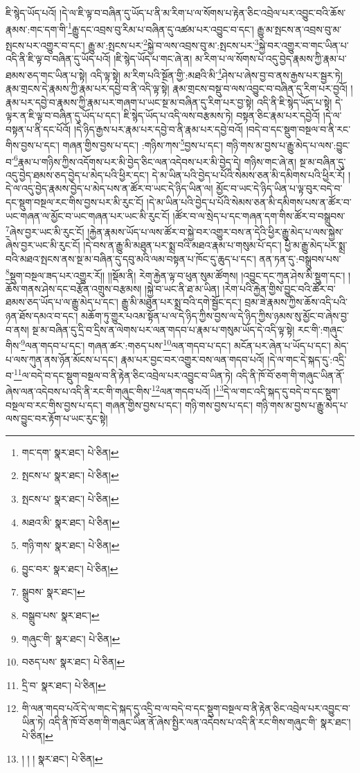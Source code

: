 ཇི་སྙེད་ཡོད་པའོ། །དེ་ལ་ཇི་ལྟ་བ་བཞིན་དུ་ཡོད་པ་ནི་མ་རིག་པ་ལ་སོགས་པ་རྟེན་ཅིང་འབྲེལ་པར་འབྱུང་བའི་ཆོས་རྣམས་:གང་དག་གི་\footnote{གང་དག་  སྣར་ཐང་།  པེ་ཅིན། }རྒྱུ་དང་འབྲས་བུ་རིམ་པ་བཞིན་དུ་འཚམ་པར་འབྱུང་བ་དང་། རྒྱུ་མ་སྤངས་ན་འབྲས་བུ་མ་སྤངས་པར་འགྱུར་བ་དང་། རྒྱུ་མ་:སྤངས་པར་\footnote{སྤངས་པ་  སྣར་ཐང་།  པེ་ཅིན། }སྐྱེ་བ་ལས་འབྲས་བུ་མ་:སྤངས་པར་\footnote{སྤངས་པ་  སྣར་ཐང་།  པེ་ཅིན། }སྐྱེ་བར་འགྱུར་བ་གང་ཡིན་པ་འདི་ནི་ཇི་ལྟ་བ་བཞིན་དུ་ཡོད་པའོ། །ཇི་སྙེད་ཡོད་པ་གང་ཞེ་ན། མ་རིག་པ་ལ་སོགས་པ་འདུ་བྱེད་རྣམས་ཀྱི་རྣམ་པ་ཐམས་ཅད་གང་ཡིན་པ་སྟེ། འདི་ལྟ་སྟེ། མ་རིག་པའི་སྔོན་གྱི་:མཐའི་མི་\footnote{མཐའ་མི་  སྣར་ཐང་།  པེ་ཅིན། }ཤེས་པ་ཞེས་བྱ་བ་ནས་རྒྱས་པར་སྦྱར་ཏེ། རྣམ་གྲངས་དེ་རྣམས་ཀྱི་རྣམ་པར་དབྱེ་བ་ནི་འདི་ལྟ་སྟེ། རྣམ་གྲངས་བསྡུ་བ་ལས་འབྱུང་བ་བཞིན་དུ་རིག་པར་བྱའོ། །རྣམ་པར་དབྱེ་བ་རྣམས་ཀྱི་རྣམ་པར་གཞག་པ་ཡང་སྔ་མ་བཞིན་དུ་རིག་པར་བྱ་སྟེ། འདི་ནི་ཇི་སྙེད་ཡོད་པ་སྟེ། དེ་ལྟར་ན་ཇི་ལྟ་བ་བཞིན་དུ་ཡོད་པ་དང་། ཇི་སྙེད་ཡོད་པ་འདི་ལས་བརྩམས་ཏེ། བསྟན་ཅིང་རྣམ་པར་དབྱེའོ། །དེ་ལ་བསྟན་པ་ནི་དང་པོའོ། །དེ་ཉིད་རྒྱས་པར་རྣམ་པར་དབྱེ་བ་ནི་རྣམ་པར་དབྱེ་བའོ། །བདེ་བ་དང་སྡུག་བསྔལ་བ་ནི་རང་གིས་བྱས་པ་དང་། གཞན་གྱིས་བྱས་པ་དང་། :གཉིས་ཀས་\footnote{གཉི་གས་  སྣར་ཐང་།  པེ་ཅིན། }བྱས་པ་དང་། གཉི་གས་མ་བྱས་པ་རྒྱུ་མེད་པ་ལས་:བྱུང་བ་\footnote{བྱུང་བར་  སྣར་ཐང་།  པེ་ཅིན། }རྣམ་པ་གཉིས་ཀྱིས་འདོགས་པར་མི་བྱེད་ཅིང་ལན་འདེབས་པར་མི་བྱེད་དེ། གཉིས་གང་ཞེ་ན། སྔ་མ་བཞིན་དུ་འདུ་བྱེད་ཐམས་ཅད་བྱེད་པ་མེད་པའི་ཕྱིར་དང་། དེ་མ་ཡིན་པའི་བྱེད་པ་པོའི་སེམས་ཅན་མི་དམིགས་པའི་ཕྱིར་རོ། །དེ་ལ་འདུ་བྱེད་རྣམས་བྱེད་པ་མེད་པས་ན་ཚོར་བ་ཡང་དེ་ཉིད་ཡིན་ལ། མྱོང་བ་ཡང་དེ་ཉིད་ཡིན་པ་ལྟ་བུར་བདེ་བ་དང་སྡུག་བསྔལ་རང་གིས་བྱས་པར་མི་རུང་ངོ། །དེ་མ་ཡིན་པའི་བྱེད་པ་པོའི་སེམས་ཅན་མི་དམིགས་པས་ན་ཚོར་བ་ཡང་གཞན་ལ་མྱོང་བ་ཡང་གཞན་པར་ཡང་མི་རུང་ངོ། །ཚོར་བ་ལ་སྲེད་པ་དང་གཞན་དག་གིས་ཚོར་བ་བསྒྲུབས་\footnote{སྒྲུབས་  སྣར་ཐང་། }ཞེས་བྱར་ཡང་མི་རུང་ངོ། །རྐྱེན་རྣམས་ཡོད་པ་ལས་ཚོར་བ་སྐྱེ་བར་འགྱུར་བས་ན་དེའི་ཕྱིར་རྒྱུ་མེད་པ་ལས་སྐྱེས་ཞེས་བྱར་ཡང་མི་རུང་ངོ། །དེ་བས་ན་རྒྱུ་མི་མཐུན་པར་སྨྲ་བའི་མཐའ་རྣམ་པ་གསུམ་པོ་དང་། ཕྱི་མ་རྒྱུ་མེད་པར་སྨྲ་བའི་མཐའ་སྤངས་ནས་སྔ་མ་བཞིན་དུ་དབུ་མའི་ལམ་བསྟན་པ་ཁོང་དུ་ཆུད་པ་དང་། ནན་ཏན་དུ་:བསྒྲུབས་པས་\footnote{བསྒྲུབ་པས་  སྣར་ཐང་། }སྡུག་བསྔལ་ཟད་པར་འགྱུར་རོ།། །།སྡོམ་ནི། རེག་རྐྱེན་ལྟ་བ་ཕུན་སུམ་ཚོགས། །འབྱུང་དང་ཀུན་ཤེས་མི་སྡུག་དང་། །ཆོས་གནས་ཤེས་དང་བརྩོན་འགྲུས་བརྩམས། །སྐྱེ་བ་ཡང་ནི་ཐ་མ་ཡིན། །རེག་པའི་རྐྱེན་གྱིས་བྱུང་བའི་ཚོར་བ་ཐམས་ཅད་ཡོད་པ་ལ་རྒྱུ་མེད་པ་དང་། རྒྱུ་མི་མཐུན་པར་སྨྲ་བའི་དགེ་སྦྱོང་དང་། བྲམ་ཟེ་རྣམས་ཀྱིས་ཆོས་འདི་པའི་ཉན་ཐོས་དམའ་བ་དང་། མཆོག་ཏུ་གྱུར་པའམ་སྟོན་པ་ལ་དེ་ཉིད་ཀྱིས་བྱས་ལ་དེ་ཉིད་ཀྱིས་ཉམས་སུ་མྱོང་བ་ཞེས་བྱ་བ་ནས། སྔ་མ་བཞིན་དུ་དྲི་བ་དྲིས་ན་ལེགས་པར་ལན་གདབ་པ་རྣམ་པ་གསུམ་ཡོད་དེ་འདི་ལྟ་སྟེ། རང་གི་:གཞུང་གིས་\footnote{གཞུང་གི་  སྣར་ཐང་།  པེ་ཅིན། }ལན་གདབ་པ་དང་། གཞན་ཚར་:གཅད་པས་\footnote{བཅད་པས་  སྣར་ཐང་།  པེ་ཅིན། }ལན་གདབ་པ་དང་། མངོན་པར་ཞེན་པ་ཡོད་པ་དང་། མེད་པ་ལས་ཀུན་ནས་ཉོན་མོངས་པ་དང་། རྣམ་པར་བྱང་བར་འགྱུར་བས་ལན་གདབ་པའོ། །དེ་ལ་གང་དེ་སྐད་དུ་:འདྲི་བ་\footnote{དྲི་བ་  སྣར་ཐང་།  པེ་ཅིན། }ལ་བདེ་བ་དང་སྡུག་བསྔལ་བ་ནི་རྟེན་ཅིང་འབྲེལ་པར་འབྱུང་བ་ཡིན་ཏེ། འདི་ནི་ཁོ་བོ་ཅག་གི་གཞུང་ཡིན་ནོ་ཞེས་ལན་འདེབས་པ་འདི་ནི་རང་གི་གཞུང་གིས་\footnote{གི་ལན་གདབ་པའོ་དེ་ལ་གང་དེ་སྐད་དུ་འདྲི་བ་ལ་བདེ་བ་དང་སྡུག་བསྔལ་བ་ནི་རྟེན་ཅིང་འབྲེལ་པར་འབྱུང་བ་ཡིན་ཏེ། འདི་ནི་ཁོ་བོ་ཅག་གི་གཞུང་ཡིན་ནོ་ཞེས་སྤྱིར་ལན་འདེབས་པ་འདི་ནི་རང་གིས་གཞུང་གི་  སྣར་ཐང་།  པེ་ཅིན། }ལན་གདབ་པའོ། །\footnote{། ། །  སྣར་ཐང་།  པེ་ཅིན། }དེ་ལ་གང་འདི་སྐད་དུ་བདེ་བ་དང་སྡུག་བསྔལ་བ་རང་གིས་བྱས་པ་དང་། གཞན་གྱིས་བྱས་པ་དང་། གཉི་གས་བྱས་པ་དང་། གཉི་གས་མ་བྱས་པ་རྒྱུ་མེད་པ་ལས་བྱུང་བར་རྟོག་པ་ཡང་རུང་སྟེ། 